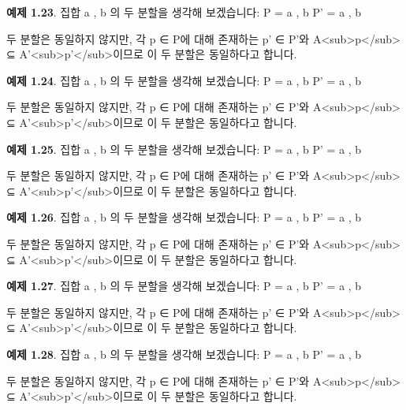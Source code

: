 \documentclass[11pt, a4paper, twoside, openany]{book}
\begin{document}
\par\medskip
\textbf{예제 1.23}. 집합 { a , b }의 두 분할을 생각해 보겠습니다:
P = { { a } , { b } }
P' = { { a , b } }

\par\medskip
두 분할은 동일하지 않지만, 각 p ∈ P\hspace{0pt}에 대해 존재하는 p' ∈ P'와 A<sub>p</sub> ⊆ A'<sub>p'</sub>이므로 이 두 분할은 동일하다고 합니다.

\par\medskip
\textbf{예제 1.24}. 집합 { a , b }의 두 분할을 생각해 보겠습니다:
P = { { a } , { b } }
P' = { { a , b } }

\par\medskip
두 분할은 동일하지 않지만, 각 p ∈ P\hspace{0pt}에 대해 존재하는 p' ∈ P'와 A<sub>p</sub> ⊆ A'<sub>p'</sub>이므로 이 두 분할은 동일하다고 합니다.

\par\medskip
\textbf{예제 1.25}. 집합 { a , b }의 두 분할을 생각해 보겠습니다:
P = { { a } , { b } }
P' = { { a , b } }

\par\medskip
두 분할은 동일하지 않지만, 각 p ∈ P\hspace{0pt}에 대해 존재하는 p' ∈ P'와 A<sub>p</sub> ⊆ A'<sub>p'</sub>이므로 이 두 분할은 동일하다고 합니다.

\par\medskip
\textbf{예제 1.26}. 집합 { a , b }의 두 분할을 생각해 보겠습니다:
P = { { a } , { b } }
P' = { { a , b } }

\par\medskip
두 분할은 동일하지 않지만, 각 p ∈ P\hspace{0pt}에 대해 존재하는 p' ∈ P'와 A<sub>p</sub> ⊆ A'<sub>p'</sub>이므로 이 두 분할은 동일하다고 합니다.

\par\medskip
\textbf{예제 1.27}. 집합 { a , b }의 두 분할을 생각해 보겠습니다:
P = { { a } , { b } }
P' = { { a , b } }

\par\medskip
두 분할은 동일하지 않지만, 각 p ∈ P\hspace{0pt}에 대해 존재하는 p' ∈ P'와 A<sub>p</sub> ⊆ A'<sub>p'</sub>이므로 이 두 분할은 동일하다고 합니다.

\par\medskip
\textbf{예제 1.28}. 집합 { a , b }의 두 분할을 생각해 보겠습니다:
P = { { a } , { b } }
P' = { { a , b } }

\par\medskip
두 분할은 동일하지 않지만, 각 p ∈ P\hspace{0pt}에 대해 존재하는 p' ∈ P'와 A<sub>p</sub> ⊆ A'<sub>p'</sub>이므로 이 두 분할은 동일하다고 합니다.
\end{document}
